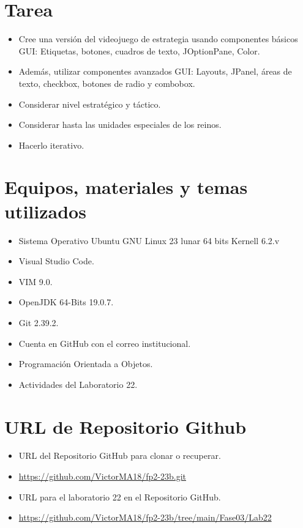 \documentclass{article}
\begin{document}
	\section{Tarea}
	\begin{itemize}		
		\item Cree una versión del videojuego de estrategia usando componentes básicos GUI: Etiquetas, botones,
		cuadros de texto, JOptionPane, Color.
		\item Además, utilizar componentes avanzados GUI: Layouts, JPanel, áreas de texto, checkbox, botones de
		radio y combobox.
		\item Considerar nivel estratégico y táctico.
		\item Considerar hasta las unidades especiales de los reinos.
		\item Hacerlo iterativo.
	\end{itemize}

	\section{Equipos, materiales y temas utilizados}
	\begin{itemize}
		\item Sistema Operativo Ubuntu GNU Linux 23 lunar 64 bits Kernell 6.2.v
		\item Visual Studio Code.
		\item VIM 9.0.
		\item OpenJDK 64-Bits 19.0.7.
		\item Git 2.39.2.
		\item Cuenta en GitHub con el correo institucional.
		\item Programación Orientada a Objetos.
		\item Actividades del Laboratorio 22.	
	\end{itemize}
	
	\section{URL de Repositorio Github}
	\begin{itemize}
		\item URL del Repositorio GitHub para clonar o recuperar.
		\item \url{https://github.com/VictorMA18/fp2-23b.git}
		\item URL para el laboratorio 22 en el Repositorio GitHub.
		\item \url{https://github.com/VictorMA18/fp2-23b/tree/main/Fase03/Lab22}
	\end{itemize}
	
\end{document}
